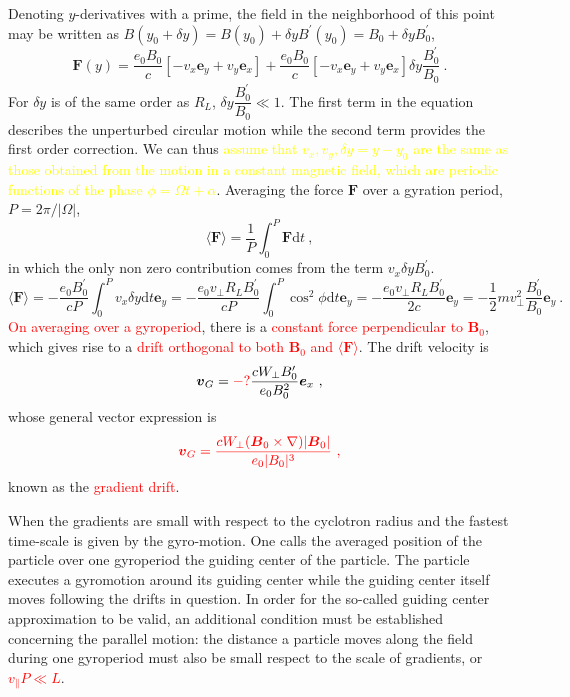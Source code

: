 \documentclass[12pt,a4paper]{article}
\renewcommand{\vec}[1]{\boldsymbol{#1}}
\newcommand{\dif}{\mathrm{d}}
\begin{document}
Denoting $y$-derivatives with a prime, the field in the neighborhood of this point may be written as $B(y_0 + \delta y) = B(y_0) + \delta y B^\prime(y_0) = B_0 + \delta y B_0^\prime$,
\begin{equation}
\vec{F}(y) = \frac{e_0 B_0}{c} \left[-v_x \vec{e}_y +v_y \vec{e}_x \right] +\frac{e_0 B_0}{c} \left[-v_x \vec{e}_y +v_y \vec{e}_x \right] \delta y \frac{B_0^\prime}{B_0} ~.
\end{equation}
For $\delta y$ is of the same order as $R_L$, $\delta y \dfrac{B_0^\prime}{B_0} \ll 1$. The first term in the equation describes the unperturbed circular motion while the second term provides the first order correction. We can thus \textcolor{yellow}{assume that $v_x,  v_y,  \delta y = y -y_0$ are the same as those obtained from the motion in a constant magnetic field, which are periodic functions of the phase $\phi = \Omega t + \alpha$}. Averaging the force $\vec{F}$ over a gyration period, $P = 2\pi/|\Omega|$, 
\begin{equation*}
\langle \vec{F} \rangle = \frac{1}{P} \int_0^P \vec{F} \dif t ~,
\end{equation*}
in which the only non zero contribution comes from the term $v_x \delta y B_0^\prime$. 
\begin{equation*}
\langle \vec{F} \rangle = -\frac{e_0 B^\prime_0}{cP} \int_0^P v_x \delta y \dif t \vec{e}_y = -\frac{e_0 v_\perp R_L B^\prime_0}{cP} \int_0^P \cos^2 \phi \dif t \vec{e}_y = -\frac{e_0 v_\perp R_L B^\prime_0}{2c}  \vec{e}_y = -\frac{1}{2} mv^2_\perp \frac{B_0^\prime}{B_0} \vec{e}_y ~.
\end{equation*}
\textcolor{red}{On averaging over a gyroperiod}, there is a \textcolor{red}{constant force perpendicular to $\vec{B}_0$}, which gives rise to a \textcolor{red}{drift orthogonal to both $\vec{B}_0$ and $\langle \vec{F} \rangle$}. The drift velocity is
\begin{equation*}
\vec{v}_G = {\color{red} - ?} \frac{cW_\perp B^\prime_0}{e_0 B^2_0} \vec{e}_x ~,
\end{equation*}
 whose general vector expression is
 \begin{equation}
\color{red} \vec{v}_G = \frac{cW_\perp (\vec{B}_0 \times \nabla) |\vec{B}_0|}{e_0 |B_0|^3} ~,
\end{equation}
known as the \textcolor{red}{gradient drift}.

When the gradients are small with respect to the cyclotron radius and the fastest time-scale is given by the gyro-motion. One calls the averaged position of the particle over one gyroperiod the guiding center of the particle. The particle executes a gyromotion around its guiding center while the guiding center itself moves following the drifts in question. In order for the so-called guiding center approximation to be valid, an additional condition must be established concerning the parallel motion: the distance a particle moves along the field during one gyroperiod must also be small respect to the scale of gradients, or \textcolor{red}{$v_\parallel P \ll L$}.
\end{document}
